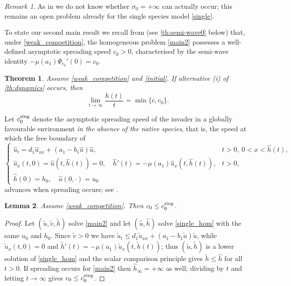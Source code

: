 \documentclass[reqno]{amsart}
\theoremstyle{plain}
\newtheorem{theorem}{Theorem}
\newtheorem{lemma}[theorem]{Lemma}
\theoremstyle{definition}
\theoremstyle{remark}
\newtheorem{remark}{Remark}
\begin{document}
\begin{remark}\label{rm:criteria}
	As in \cite[Remark 1.6]{HU20205931} we do not know whether
	$\sigma_0=+\infty$ can actually occur; this remains an open problem already
	for the single species model \eqref{single}.
\end{remark}

To state our second main result we recall from \cite[Theorem 1.5]{MR3986328}
(see \cref{th:semi-wave0} below) that, under \eqref{weak_competition}, the
homogeneous problem \eqref{main2} possesses a well-defined asymptotic spreading
speed $c_0>0$, characterised by the semi-wave identity
$-\mu(a_1)\Psi_{c_0}'(0)=c_0$.

\begin{theorem}\label{th:spreading_speed}
	Assume \eqref{weak_competition} and \eqref{initial}. If alternative (i) of
	\cref{th:dynamics} occurs, then
	\[
	\lim_{t\to\infty} \frac{h(t)}{t} = \min\{c, c_0\}.
	\]
\end{theorem}

Let $c_0^{\rm sing}$ denote the asymptotic spreading speed of the invader in a
globally favourable environment \emph{in the absence of the native species},
that is, the speed at which the free boundary of
\begin{equation}\label{single_hom}
	\begin{cases}
		\hat u_t = d_1\hat u_{xx}+(a_1-b_1\hat u)\hat u, & t>0,\ 0<x<\hat h(t),\\
		\hat u_x(t,0)=\hat u(t,\hat h(t))=0,\quad \hat h'(t)=-\mu(a_1)\hat u_x(t,\hat h(t)), & t>0,\\
		\hat h(0)=h_0,\quad \hat u(0,\cdot)=u_0
	\end{cases}
\end{equation}
advances when spreading occurs; see \cite{MR2607347,MR4404216}.

\begin{lemma}\label{lm:c0sing}
	Assume \eqref{weak_competition}. Then $c_0\le c_0^{\rm sing}$.
\end{lemma}

\begin{proof}
	Let $(\tilde u,\tilde v,\tilde h)$ solve \eqref{main2} and let
	$(\hat u,\hat h)$ solve \eqref{single_hom} with the same $u_0$ and $h_0$.
	Since $\tilde v>0$ we have
	$\tilde u_t\le d_1\tilde u_{xx}+(a_1-b_1\tilde u)\tilde u$, while
	$\tilde u_x(t,0)=0$ and $\tilde h'(t)=-\mu(a_1)\tilde u_x(t,\tilde h(t))$;
	thus $(\tilde u,\tilde h)$ is a lower solution of \eqref{single_hom} and the
	scalar comparison principle gives $\tilde h\le\hat h$ for all $t>0$. If
	spreading occurs for \eqref{main2} then $\hat h_\infty=+\infty$ as well;
	dividing by $t$ and letting $t\to\infty$ gives $c_0\le c_0^{\rm sing}$.
\end{proof}
\end{document}
